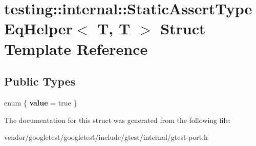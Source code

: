 \hypertarget{structtesting_1_1internal_1_1StaticAssertTypeEqHelper_3_01T_00_01T_01_4}{}\section{testing\+:\+:internal\+:\+:Static\+Assert\+Type\+Eq\+Helper$<$ T, T $>$ Struct Template Reference}
\label{structtesting_1_1internal_1_1StaticAssertTypeEqHelper_3_01T_00_01T_01_4}
\subsection*{Public Types}
\begin{DoxyCompactItemize}
\item 
enum \{ {\bfseries value} = true
 \}\hypertarget{structtesting_1_1internal_1_1StaticAssertTypeEqHelper_3_01T_00_01T_01_4_acdb69a9c4164628ea6a80bd6442058c6}{}\label{structtesting_1_1internal_1_1StaticAssertTypeEqHelper_3_01T_00_01T_01_4_acdb69a9c4164628ea6a80bd6442058c6}

\end{DoxyCompactItemize}


The documentation for this struct was generated from the following file\+:\begin{DoxyCompactItemize}
\item 
vendor/googletest/googletest/include/gtest/internal/gtest-\/port.\+h\end{DoxyCompactItemize}
